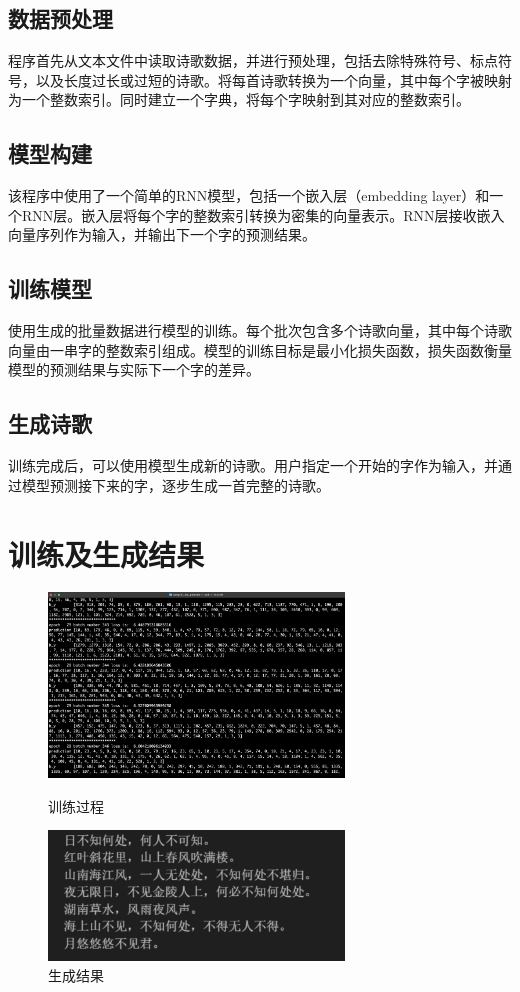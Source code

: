 \documentclass[UTF8]{ctexart}
\begin{document}
\subsection{数据预处理}
程序首先从文本文件中读取诗歌数据，并进行预处理，包括去除特殊符号、标点符号，以及长度过长或过短的诗歌。将每首诗歌转换为一个向量，其中每个字被映射为一个整数索引。同时建立一个字典，将每个字映射到其对应的整数索引。
\subsection{模型构建}
该程序中使用了一个简单的RNN模型，包括一个嵌入层（embedding layer）和一个RNN层。嵌入层将每个字的整数索引转换为密集的向量表示。RNN层接收嵌入向量序列作为输入，并输出下一个字的预测结果。
\subsection{训练模型}
使用生成的批量数据进行模型的训练。每个批次包含多个诗歌向量，其中每个诗歌向量由一串字的整数索引组成。模型的训练目标是最小化损失函数，损失函数衡量模型的预测结果与实际下一个字的差异。
\subsection{生成诗歌}
训练完成后，可以使用模型生成新的诗歌。用户指定一个开始的字作为输入，并通过模型预测接下来的字，逐步生成一首完整的诗歌。
\section{训练及生成结果}
\begin{figure}[H]
    \centering
    \includegraphics[width=0.7\textwidth]{./assets/1.png}
    \caption{训练过程}
    \includegraphics[width=0.7\textwidth]{./assets/2.png}
    \caption{生成结果}
\end{figure}
\end{document}
